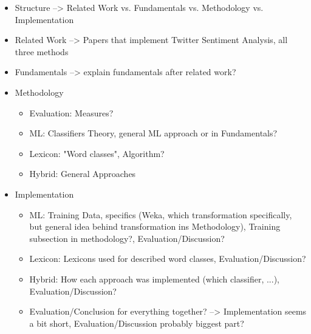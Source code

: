 \begin{itemize}
\item Structure --> Related Work vs. Fundamentals vs. Methodology vs. Implementation
\item Related Work --> Papers that implement Twitter Sentiment Analysis, all three methods
\item Fundamentals --> explain fundamentals after related work?
\item Methodology \begin{itemize}
    \item Evaluation: Measures?
    \item ML: Classifiers Theory, general ML approach or in Fundamentals?
    \item Lexicon: "Word classes", Algorithm?
    \item Hybrid: General Approaches
\end{itemize}
\item Implementation \begin{itemize}
    \item ML: Training Data, specifics (Weka, which transformation specifically, but general idea behind transformation ins Methodology), Training subsection in methodology?, Evaluation/Discussion?
    \item Lexicon: Lexicons used for described word classes, Evaluation/Discussion?
    \item Hybrid: How each approach was implemented (which classifier, ...), Evaluation/Discussion?
    \item Evaluation/Conclusion for everything together? --> Implementation seems a bit short, Evaluation/Discussion probably biggest part?
\end{itemize}
\end{itemize}



